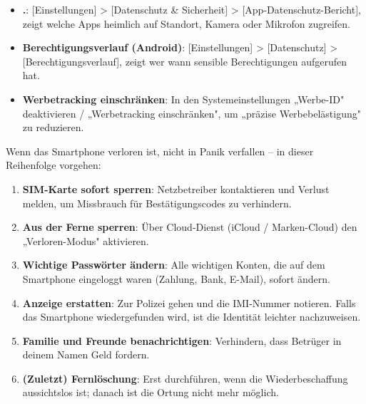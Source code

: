 
\begin{itemize}
  \item \textbf{.}: [Einstellungen] > [Datenschutz \& Sicherheit] > [App-Datenschutz-Bericht], zeigt welche Apps heimlich auf Standort, Kamera oder Mikrofon zugreifen.
  \item \textbf{Berechtigungsverlauf (Android)}: [Einstellungen] > [Datenschutz] > [Berechtigungsverlauf], zeigt wer wann sensible Berechtigungen aufgerufen hat.
  \item \textbf{Werbetracking einschränken}: In den Systemeinstellungen „Werbe-ID" deaktivieren / „Werbetracking einschränken", um „präzise Werbebelästigung" zu reduzieren.
\end{itemize}


Wenn das Smartphone verloren ist, nicht in Panik verfallen – in dieser Reihenfolge vorgehen:

\begin{enumerate}
  \item \textbf{SIM-Karte sofort sperren}: Netzbetreiber kontaktieren und Verlust melden, um Missbrauch für Bestätigungscodes zu verhindern.
  \item \textbf{Aus der Ferne sperren}: Über Cloud-Dienst (iCloud / Marken-Cloud) den „Verloren-Modus" aktivieren.
  \item \textbf{Wichtige Passwörter ändern}: Alle wichtigen Konten, die auf dem Smartphone eingeloggt waren (Zahlung, Bank, E-Mail), sofort ändern.
  \item \textbf{Anzeige erstatten}: Zur Polizei gehen und die IMI-Nummer notieren. Falls das Smartphone wiedergefunden wird, ist die Identität leichter nachzuweisen.
  \item \textbf{Familie und Freunde benachrichtigen}: Verhindern, dass Betrüger in deinem Namen Geld fordern.
  \item \textbf{(Zuletzt) Fernlöschung}: Erst durchführen, wenn die Wiederbeschaffung aussichtslos ist; danach ist die Ortung nicht mehr möglich.
\end{enumerate}


